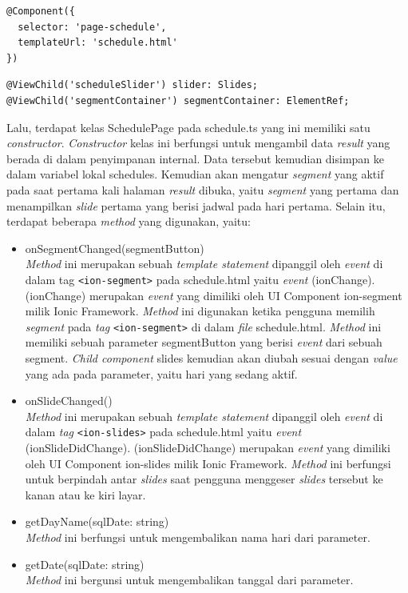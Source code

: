 \begin{enumerate}
\begin{lstlisting}[label={lst:componentschedule}, caption=@Component pada schedule.ts]
@Component({
  selector: 'page-schedule',
  templateUrl: 'schedule.html'
})
\end{lstlisting}

\begin{lstlisting}[label={lst:viewchildtresult}, caption=@ViewChild pada schedule.ts]
@ViewChild('scheduleSlider') slider: Slides;
@ViewChild('segmentContainer') segmentContainer: ElementRef;
\end{lstlisting} 
\newpage
	Lalu, terdapat kelas SchedulePage pada schedule.ts yang ini memiliki satu \textit{constructor}. \textit{Constructor} kelas ini berfungsi untuk mengambil data \textit{result} yang berada di dalam penyimpanan internal. Data tersebut kemudian disimpan ke dalam variabel lokal schedules. Kemudian akan mengatur \textit{segment} yang aktif pada saat pertama kali halaman \textit{result} dibuka, yaitu \textit{segment} yang pertama dan menampilkan \textit{slide} pertama yang berisi jadwal pada hari pertama. Selain itu, terdapat beberapa \textit{method} yang digunakan, yaitu:
	
	\begin{itemize}
		\item onSegmentChanged(segmentButton) \\
		\textit{Method} ini merupakan sebuah \textit{template statement} dipanggil oleh \textit{event} di dalam tag \texttt{<ion-segment>} pada schedule.html yaitu \textit{event} (ionChange). (ionChange) merupakan \textit{event} yang dimiliki oleh UI Component ion-segment milik Ionic Framework. \textit{Method} ini digunakan ketika pengguna memilih \textit{segment} pada \textit{tag} \texttt{<ion-segment>} di dalam \textit{file} schedule.html. \textit{Method} ini memiliki sebuah parameter segmentButton yang berisi \textit{event} dari sebuah segment. \textit{Child component} slides kemudian akan diubah sesuai dengan \textit{value} yang ada pada parameter, yaitu hari yang sedang aktif. 
		
		\item onSlideChanged() \\
		\textit{Method} ini merupakan sebuah \textit{template statement} dipanggil oleh \textit{event} di dalam \textit{tag} \texttt{<ion-slides>} pada schedule.html yaitu \textit{event} (ionSlideDidChange). (ionSlideDidChange) merupakan \textit{event} yang dimiliki oleh UI Component ion-slides milik Ionic Framework. \textit{Method} ini berfungsi untuk berpindah antar \textit{slides} saat pengguna menggeser \textit{slides} tersebut ke kanan atau ke kiri layar.
		\item getDayName(sqlDate: string) \\
		\textit{Method} ini berfungsi untuk mengembalikan nama hari dari parameter.
		\item getDate(sqlDate: string) \\
		\textit{Method} ini bergunsi untuk mengembalikan tanggal dari parameter.
	\end{itemize}
	

\end{enumerate}
